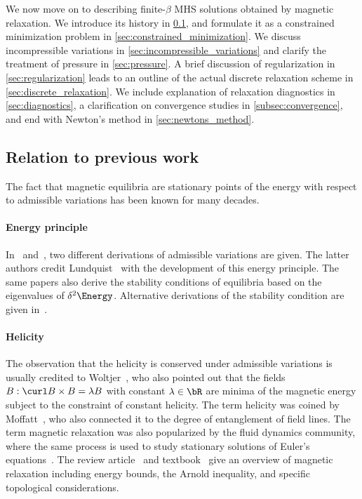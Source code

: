 \documentclass[%
 reprint,
 superscriptaddress,
 amsmath,amssymb,
 aps, nofootinbib, floatfix]{revtex4-2}
\begin{document}
We now move on to describing finite-$\beta$ MHS solutions obtained by magnetic relaxation. We introduce its history in \ref{sec:previous_work}, and formulate it as a constrained minimization problem in \ref{sec:constrained_minimization}. We discuss incompressible variations in \ref{sec:incompressible_variations} and clarify the treatment of pressure in \ref{sec:pressure}. A brief discussion of regularization in \ref{sec:regularization} leads to an outline of the actual discrete relaxation scheme in \ref{sec:discrete_relaxation}. We include explanation of relaxation diagnostics in \ref{sec:diagnostics}, a clarification on convergence studies in \ref{subsec:convergence}, and end with Newton's method in \ref{sec:newtons_method}.

\subsection{Relation to previous work}
\label{sec:previous_work}
The fact that magnetic equilibria are stationary points of the energy with respect to admissible variations has been known for many decades.

\paragraph{Energy principle}
In~\cite{grad_hydromagnetic_1958} and~\cite{bernstein_energy_1958}, two different derivations of admissible variations are given. The latter authors credit Lundquist~\cite{lundquist_stability_1951} with the development of this energy principle. The same papers also derive the stability conditions of equilibria based on the eigenvalues of $\delta^2 \Energy$. Alternative derivations of the stability condition are given in~\cite{hain_zur_1957,merkel_holonome_1977}.
%
\paragraph{Helicity}
The observation that the helicity is conserved under admissible variations is usually credited to Woltjer~\cite{woltjer_theorem_1958}, who also pointed out that the fields $B: \curl B \times B = \lambda B$ with constant $\lambda \in \bR$ are minima of the magnetic energy subject to the constraint of constant helicity. The term helicity was coined by Moffatt~\cite{moffatt_degree_1969}, who also connected it to the degree of entanglement of field lines. The term magnetic relaxation was also popularized by the fluid dynamics community, where the same process is used to study stationary solutions of Euler's equations~\cite{moffatt_magnetostatic_1985, moffatt_magnetostatic_1986}. The review article~\cite{moffatt_topological_2021} and textbook~\cite{arnold_topological_2021} give an overview of magnetic relaxation including energy bounds, the Arnold inequality, and specific topological considerations.
\end{document}
